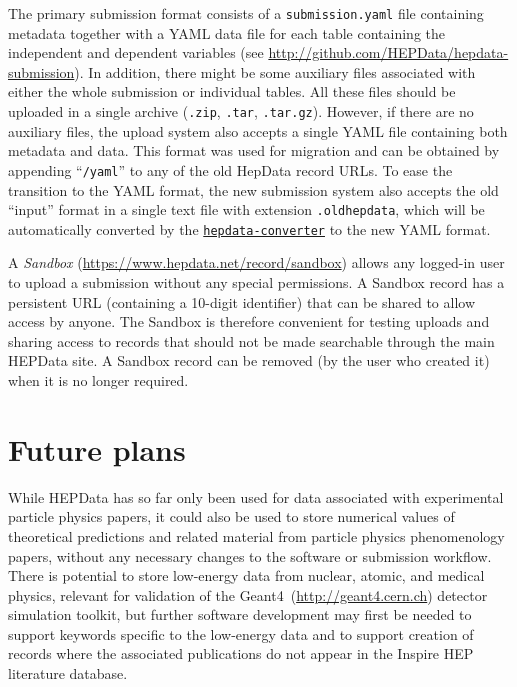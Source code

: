 \documentclass[a4paper]{jpconf}
\begin{document}
The primary submission format consists of a \texttt{submission.yaml} file containing metadata together with a YAML data file for each table containing the independent and dependent variables (see \url{http://github.com/HEPData/hepdata-submission}).  In addition, there might be some auxiliary files associated with either the whole submission or individual tables.  All these files should be uploaded in a single archive (\texttt{.zip}, \texttt{.tar}, \texttt{.tar.gz}).  However, if there are no auxiliary files, the upload system also accepts a single YAML file containing both metadata and data.  This format was used for migration and can be obtained by appending ``\texttt{/yaml}'' to any of the old HepData record URLs.  To ease the transition to the YAML format, the new submission system also accepts the old ``input'' format in a single text file with extension \texttt{.oldhepdata}, which will be automatically converted by the \href{https://github.com/HEPData/hepdata-converter}{\texttt{hepdata-converter}} to the new YAML format.

A \emph{Sandbox} (\url{https://www.hepdata.net/record/sandbox}) allows any logged-in user to upload a submission without any special permissions.  A Sandbox record has a persistent URL (containing a 10-digit identifier) that can be shared to allow access by anyone.  The Sandbox is therefore convenient for testing uploads and sharing access to records that should not be made searchable through the main HEPData site.  A Sandbox record can be removed (by the user who created it) when it is no longer required.

\section{Future plans}

While HEPData has so far only been used for data associated with experimental particle physics papers, it could also be used to store numerical values of theoretical predictions and related material from particle physics phenomenology papers, without any necessary changes to the software or submission workflow.  There is potential to store low-energy data from nuclear, atomic, and medical physics, relevant for validation of the Geant4~(\url{http://geant4.cern.ch}) detector simulation toolkit, but further software development may first be needed to support keywords specific to the low-energy data and to support creation of records where the associated publications do not appear in the Inspire HEP literature database.
\end{document}
